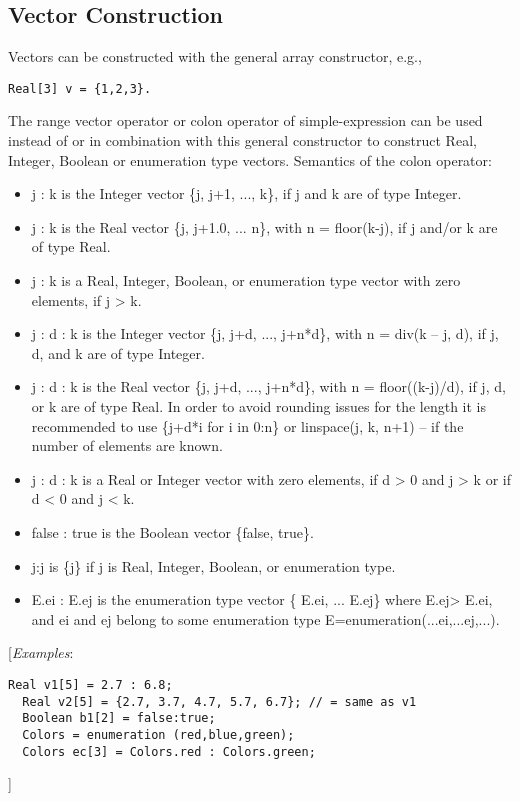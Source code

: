 \subsection{Vector Construction}

Vectors can be constructed with the general array constructor, e.g.,
\begin{lstlisting}[language=modelica]
  Real[3] v = {1,2,3}.
\end{lstlisting}
The range vector operator or colon operator of simple-expression can be
used instead of or in combination with this general constructor to
construct Real, Integer, Boolean or enumeration type vectors. Semantics
of the colon operator:

\begin{itemize}
\item
  j : k is the Integer vector \{j, j+1, ..., k\}, if j and k are of type
  Integer.
\item
  j : k is the Real vector \{j, j+1.0, ... n\}, with n = floor(k-j), if
  j and/or k are of type Real.
\item
  j : k is a Real, Integer, Boolean, or enumeration type vector with
  zero elements, if j \textgreater{} k.
\item
  j : d : k is the Integer vector \{j, j+d, ..., j+n*d\}, with n = div(k
  -- j, d), if j, d, and k are of type Integer.
\item
  j : d : k is the Real vector \{j, j+d, ..., j+n*d\}, with n =
  floor((k-j)/d), if j, d, or k are of type Real. In order to avoid
  rounding issues for the length it is recommended to use \{j+d*i for i
  in 0:n\} or linspace(j, k, n+1) -- if the number of elements are
  known.
\item
  j : d : k is a Real or Integer vector with zero elements, if d
  \textgreater{} 0 and j \textgreater{} k or if d \textless{} 0 and j
  \textless{} k.
\item
  false : true is the Boolean vector \{false, true\}.
\item
  j:j is \{j\} if j is Real, Integer, Boolean, or enumeration type.
\item
  E.ei : E.ej is the enumeration type vector \{ E.ei, ... E.ej\} where
  E.ej\textgreater{} E.ei, and ei and ej belong to some enumeration type
  E=enumeration(...ei,...ej,...).
\end{itemize}

{[}\emph{Examples}:

\begin{lstlisting}[language=modelica]
  Real v1[5] = 2.7 : 6.8;
  Real v2[5] = {2.7, 3.7, 4.7, 5.7, 6.7}; // = same as v1
  Boolean b1[2] = false:true;
  Colors = enumeration (red,blue,green);
  Colors ec[3] = Colors.red : Colors.green;
\end{lstlisting}
{]}

